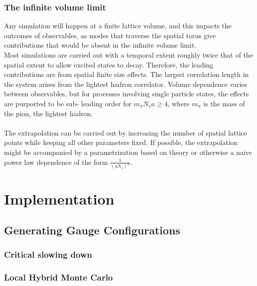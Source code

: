 \documentclass[a4paper,10pt]{article}
\begin{document}
\subsubsection{The infinite volume limit}
Any simulation will happen at a finite lattice volume, and this impacts the outcomes of observables, as modes that traverse the spatial torus give contributions that would be absent in the infinite volume limit.\\Most simulations are carried out with a temporal extent roughly twice that of the spatial extent to allow excited states to decay. Therefore, the leading contributions are from spatial finite size effects. The largest correlation length in the system arises from the lightest hadron correlator. Volume dependence varies between observables, but for processes involving single particle states, the effects are purported to be sub- leading order for $m_\pi N_sa \geq 4$, where $m_\pi$ is the mass of the pion, the lightest hadron.\\\\The extrapolation can be carried out by increasing the number of spatial lattice points while keeping all other parameters fixed. If possible, the extrapolation might be accompanied by a parametrization based on theory or otherwise a naive power law dependence of the form $\frac{1}{(aN_s)^n}$.

\section{Implementation}
\subsection{Generating Gauge Configurations}
\subsubsection{Critical slowing down}

\subsubsection{Local Hybrid Monte Carlo}
\end{document}
